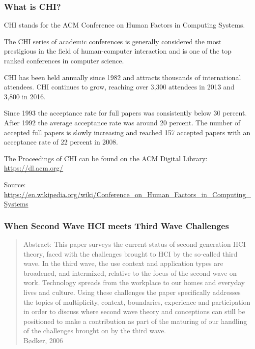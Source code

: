 \documentclass[screen, aspectratio=169]{beamer}
\begin{document}
%
%
\begin{frame}
\frametitle{What is CHI?}
\begin{itemize}
{\small
\item CHI stands for the ACM Conference on Human Factors in Computing Systems.
\item The CHI series of academic conferences is generally considered the most prestigious in the field of human-computer interaction and is one of the top ranked conferences in computer science.
\item CHI has been held annually since 1982 and attracts thousands of international attendees. CHI continues to grow, reaching over 3,300 attendees in 2013 and 3,800 in 2016.
\item Since 1993 the acceptance rate for full papers was consistently below 30 percent. After 1992 the average acceptance rate was around 20 percent. The number of accepted full papers is slowly increasing and reached 157 accepted papers with an acceptance rate of 22 percent in 2008.
\item The Proceedings of CHI can be found on the ACM Digital Library: \url{https://dl.acm.org/}
}
\end{itemize}
{\scriptsize Source: \url{https://en.wikipedia.org/wiki/Conference_on_Human_Factors_in_Computing_Systems}}
\end{frame}
%
\begin{frame}
\frametitle{When Second Wave HCI meets Third Wave Challenges}
\begin{quote}
Abstract: This paper surveys the current status of second generation HCI theory, faced with the 
challenges brought to HCI by the so-called third wave. In the third wave, the use context and application types are broadened, and intermixed, relative to the focus of the second wave on work. Technology spreads from the workplace to our homes and everyday lives and culture. Using these challenges the paper specifically addresses the topics of multiplicity, context, boundaries, experience and participation in order to discuss where second wave theory and conceptions can still be positioned to make a contribution as part of the maturing of our handling of the challenges brought on by the third wave. \\
B{\o}dker, 2006 \cite{Bodker.2006.second}
\end{quote}
\end{frame}
\end{document}
